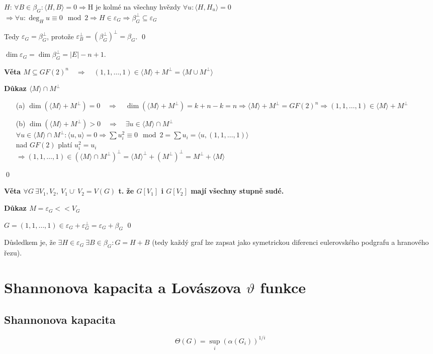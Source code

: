 \documentclass[a4paper,12pt,titlepage]{article}
\newcommand{\shn}{\Theta}
\newcommand{\dk}{\smallskip\noindent\bf Důkaz\rm{} }
\newcommand{\vt}{\smallskip\noindent\bf Věta\rm{} }
\newcommand{\sk}[1]{\langle #1\rangle}
\begin{document}
$H$: $\forall B\in \beta_G: \sk{H,B} = 0 \Rightarrow $H je kolmé na všechny hvězdy $\forall u: \sk{H,H_u} = 0$ \\ $\Rightarrow \forall u: \deg_H u \equiv 0 \mod 2 \Rightarrow H \in \varepsilon_G \Rightarrow \beta_G^\bot \subseteq \varepsilon_G$

Tedy $\varepsilon_G = \beta_G^\bot$, protože $\varepsilon_B^\bot = {\left(\beta_G^\bot\right)}^\bot = \beta_G$.
\qed

$\dim \varepsilon_G = \dim \beta_G^\bot = |E| - n + 1$.


\vt $M \subseteq GF(2)^n \quad\Rightarrow\quad (1,1,\dots,1) \in \sk M + M^\bot = \sk{M\cup M^\bot}$

\dk $\sk M \cap M^\bot$
\begin{enumerate}
\item[(a)] $\dim(\sk M + M^\bot) = 0 \quad\Rightarrow\quad \dim(\sk M + M^\bot) = k+n-k = n \Rightarrow \sk M + M^\bot = GF(2)^n \Rightarrow (1,1,\dots,1)\in \sk M + M^\bot$
\item[(b)] $\dim(\sk M + M^\bot) > 0 \quad\Rightarrow\quad \exists u\in \sk M \cap M^\bot$ \\ 
$\forall u\in \sk M \cap M^\bot: \sk{u,u} = 0 \Rightarrow \sum u_i^2 \equiv 0 \mod 2 = \sum u_i = \sk{u, (1,1,\dots,1)}$ \\
nad $GF(2)$ platí $u_i^2 = u_i$ \\
$\Rightarrow (1,1,\dots,1) \in {(\sk M \cap M^\bot)}^\bot = {\sk M}^\bot + {(M^\bot)}^\bot = M^\bot + \sk M$
\end{enumerate}
\qed


\vt $\forall G \ \exists V_1,V_2,\ V_1\cup^\cdot V_2 = V(G)$ t. že $G[V_1]$ i $G[V_2]$ mají všechny stupně sudé.

\dk $M = \varepsilon_G << V_G$

$G = (1,1,\dots,1) \in \varepsilon_G + \varepsilon_G^\bot = \varepsilon_G + \beta_G$
\qed

Důsledkem je, že $\exists H \in \varepsilon_G\ \exists B\in \beta_G: G = H + B$ (tedy každý graf lze zapsat jako symetrickou diferenci eulerovského podgrafu a hranového řezu).


\section{Shannonova kapacita a Lovászova $\vartheta$ funkce}
\subsection{Shannonova kapacita}
$$
	\shn(G) = \sup_i(\alpha(G_i))^{1/i}
$$
\end{document}
